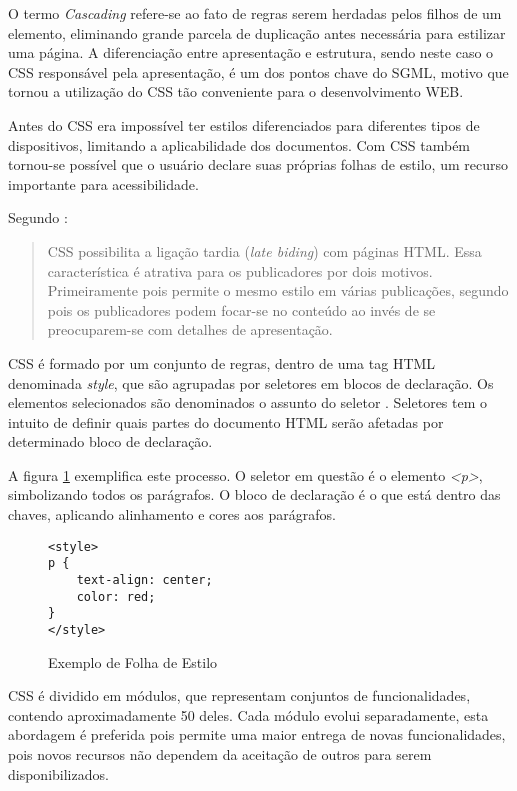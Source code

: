O termo \textit{Cascading} refere-se ao fato de regras serem herdadas
pelos filhos de um elemento, eliminando grande parcela de duplicação
antes necessária para estilizar uma página. A diferenciação entre
apresentação e estrutura, sendo neste caso o CSS responsável pela
apresentação, é um dos pontos chave do SGML, motivo que tornou a
utilização do CSS tão conveniente para o desenvolvimento WEB.

Antes do CSS era impossível ter estilos diferenciados para diferentes
tipos de dispositivos, limitando a aplicabilidade dos documentos.
Com CSS também tornou-se possível que o usuário declare suas próprias
folhas de estilo, um recurso importante para acessibilidade.

Segundo \cite[pp. 23--24]{CascadingStyleSheets}:

\begin{quote}
CSS possibilita a ligação tardia (\textit{late biding}) com
páginas HTML. Essa característica é atrativa para os publicadores
por dois motivos. Primeiramente pois permite o mesmo estilo em várias
publicações, segundo pois os publicadores podem focar-se no conteúdo
ao invés de se preocuparem-se com detalhes de apresentação.
\end{quote}

CSS é formado por um conjunto de regras, dentro de uma tag HTML
denominada \textit{style}, que são agrupadas por seletores em blocos
de declaração. Os elementos selecionados são denominados o assunto
do seletor \autocite{cssSelectors}. Seletores tem o intuito de definir
quais partes do documento HTML serão afetadas por determinado bloco de
declaração.

A figura \ref{fig:CSSSample} exemplifica este processo. O seletor em
questão é o elemento \textit{<p>}, simbolizando todos os parágrafos. O bloco de
declaração é o que está dentro das chaves, aplicando alinhamento e
cores aos parágrafos.

\begin{figure}
\centering
\begin{verbatim}
<style>
p {
    text-align: center;
    color: red;
}
</style>
\end{verbatim}
\caption{Exemplo de Folha de Estilo}
\label{fig:CSSSample}
\end{figure}

CSS é dividido em módulos, que representam conjuntos de
funcionalidades, contendo aproximadamente 50 deles. Cada módulo evolui
separadamente, esta abordagem é preferida pois permite uma maior
entrega de novas funcionalidades, pois novos recursos não dependem da
aceitação de outros para serem disponibilizados.

